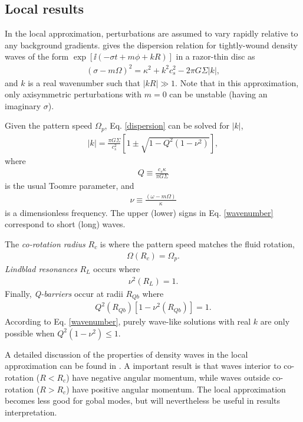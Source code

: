 \subsection{Local results}
In the local approximation, perturbations are assumed to vary rapidly
relative to any background gradients. \cite{shu91} gives the
dispersion relation for tightly-wound density 
waves of the form $\exp{[\ii(-\sigma t + m \phi + kR)]}$ in a razor-thin
disc as  
\begin{align}\label{dispersion}
  (\sigma - m\Omega)^2 = \kappa^2 + k^2c_s^2 - 2\pi G \Sigma |k|, 
\end{align}
and $k$ is a real wavenumber such that $|kR|\gg1$. Note that in this
approximation, only axisymmetric perturbations with $m=0$ can be
unstable (having an imaginary $\sigma$).  

Given the pattern speed $\Omega_p$, Eq. \ref{dispersion} can be solved
for $|k|$,   
\begin{align}\label{wavenumber}
  |k| = \frac{\pi G \Sigma}{c_s^2}\left[1 \pm \sqrt{1 -
      Q^2(1-\nu^2)}\right], 
\end{align}
where 
\begin{align}
  Q \equiv \frac{c_s\kappa}{\pi G \Sigma}
\end{align}
is the usual Toomre parameter, and
\begin{align}
  \nu \equiv \frac{(\omega - m\Omega)}{\kappa}
\end{align}
is a dimensionless frequency. The upper (lower) signs in
Eq. \ref{wavenumber} correspond to short (long) waves.  

The \emph{co-rotation radius} $R_c$ is where the pattern speed matches
the fluid rotation,
\begin{align}
  \Omega(R_c) = \Omega_p.
\end{align}
\emph{Lindblad resonances} $R_L$ occurs where
\begin{align}
  \nu^2(R_L) = 1. 
\end{align}
Finally, \emph{Q-barriers} occur at radii $R_{Qb}$ where
\begin{align}
  Q^2(R_{Qb})\left[1-\nu^2(R_{Qb})\right] = 1.  
\end{align}
According to Eq. \ref{wavenumber}, purely wave-like solutions with
real $k$ are only possible when $Q^2(1-\nu^2)\leq1$.  

A detailed discussion of the properties of density waves in the local
approximation can be found in \cite{shu91}. A important result is that
waves interior to co-rotation ($R<R_c$) have negative angular momentum, while
waves outside co-rotation ($R>R_c$) have positive angular
momentum. The local approximation becomes less good for gobal modes,
but will nevertheless be useful in results interpretation.   
